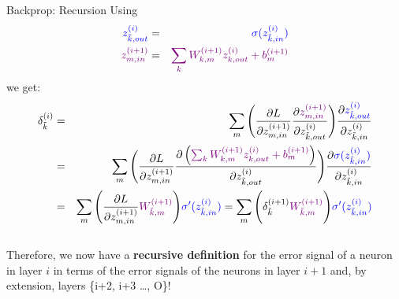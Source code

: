 \begin{frame} {Backprop: Recursion}
 Using 
 \vspace*{-5mm}
        {\footnotesize \begin{eqnarray*}
          \textcolor{blue}{z_{\tilde{k},out}^{(i)}} &=& \textcolor{blue}{\sigma(z_{\tilde{k},in}^{(i)})} \\
          \textcolor{violet}{z_{m,in}^{(i+1)}} &=& \textcolor{violet}{\sum_k W_{k,m}^{(i+1)}z_{k,out}^{(i)} + b_m^{(i+1)}}
        \end{eqnarray*}}
we get: 
      \vspace{-0.2cm}
      {\footnotesize \begin{eqnarray*}
      \delta_{\tilde{k}}^{(i)} &=& \sum_m \Bigg( \frac{\partial L}{\partial z_{m,in}^{(i+1)}} \frac{\partial \textcolor{violet}{z_{m,in}^{(i+1)}}}{\partial z_{\tilde{k},out}^{(i)}} \Bigg) \frac{\partial \textcolor{blue}{z_{\tilde{k},out}^{(i)}}}{\partial z_{\tilde{k},in}^{(i)}}  \\
       &=& \sum_m \Bigg( \frac{\partial L}{\partial z_{m,in}^{(i+1)}} \frac{\partial \left(\textcolor{violet}{\sum_k W_{k,m}^{(i+1)}z_{k,out}^{(i)} + b_m^{(i+1)}}\right)}{\partial z_{\tilde{k},out}^{(i)}} \Bigg) \frac{\partial \textcolor{blue}{\sigma(z_{\tilde{k},in}^{(i)})}}{\partial z_{\tilde{k},in}^{(i)}}  \\
      &=& \sum_m \Bigg( \frac{\partial L}{\partial z_{m,in}^{(i+1)}} \textcolor{violet}{W_{\tilde{k},m}^{(i+1)}} \Bigg) \textcolor{blue}{\sigma'(z_{\tilde{k},in}^{(i)})} = \sum_m \Bigg(  \delta_{\tilde{k}}^{(i+1)} \textcolor{violet}{W_{\tilde{k},m}^{(i+1)}} \Bigg) \textcolor{blue}{\sigma'(z_{\tilde{k},in}^{(i)})} 
      \end{eqnarray*}}\\
      Therefore, we now have a \textbf{recursive definition} for the error signal of a neuron in layer $i$ in terms of the error signals of the neurons in layer $i+1$ and, by extension, layers \{i+2, i+3 \ldots , O\}!
\end{frame}

